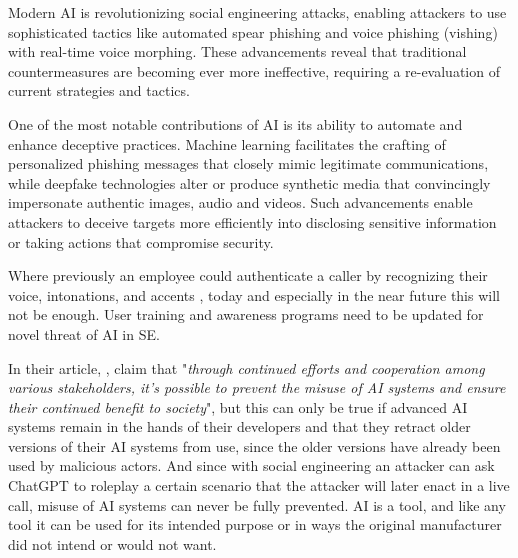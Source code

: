 
Modern AI is revolutionizing social engineering attacks, enabling attackers to use sophisticated tactics like automated spear phishing and voice phishing (vishing) with real-time voice morphing. These advancements reveal that traditional countermeasures are becoming ever more ineffective, requiring a re-evaluation of current strategies and tactics.


One of the most notable contributions of AI is its ability to automate and enhance deceptive practices. Machine learning facilitates the crafting of personalized phishing messages that closely mimic legitimate communications, while deepfake technologies alter or produce synthetic media that convincingly impersonate authentic images, audio and videos. Such advancements enable attackers to deceive targets more efficiently into disclosing sensitive information or taking actions that compromise security.

Where previously an employee could authenticate a caller by recognizing their voice, intonations, and accents \citep{mitnickArtDeceptionControlling2003}, today and especially in the near future this will not be enough. User training and awareness programs need to be updated for novel threat of AI in SE.

In their article, \cite{guptaFromChatGPTtoThreatGPT2023}, claim that "\textit{through continued efforts and cooperation among various stakeholders, it’s possible to prevent the misuse of AI systems and ensure their continued benefit to society}", but this can only be true if advanced AI systems remain in the hands of their developers and that they retract older versions of their AI systems from use, since the older versions have already been used by malicious actors. And since with social engineering an attacker can ask ChatGPT to roleplay a certain scenario that the attacker will later enact in a live call, misuse of AI systems can never be fully prevented. AI is a tool, and like any tool it can be used for its intended purpose or in ways the original manufacturer did not intend or would not want.

